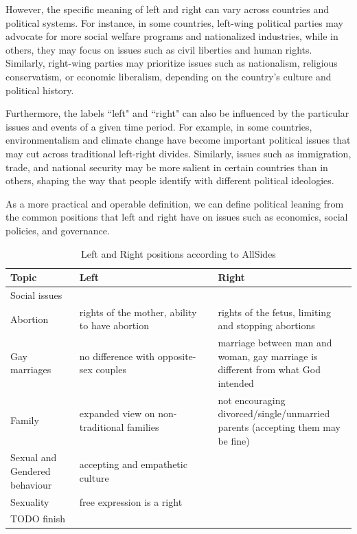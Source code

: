However, the specific meaning of left and right can vary across countries and political systems.
For instance, in some countries, left-wing political parties may advocate for more social welfare programs and nationalized industries, while in others, they may focus on issues such as civil liberties and human rights.
Similarly, right-wing parties may prioritize issues such as nationalism, religious conservatism, or economic liberalism, depending on the country's culture and political history.

Furthermore, the labels ``left" and ``right" can also be influenced by the particular issues and events of a given time period.
For example, in some countries, environmentalism and climate change have become important political issues that may cut across traditional left-right divides.
Similarly, issues such as immigration, trade, and national security may be more salient in certain countries than in others, shaping the way that people identify with different political ideologies.




As a more practical and operable definition, we can define political leaning from the common positions that left and right have on issues such as economics, social policies, and governance.


\begin{table}[ht]
    \centering
    \begin{tabular}{p{0.2\linewidth} | p{0.4\linewidth} | p{0.4\linewidth}}
      Topic  & Left & Right \\ \hline
      Social issues & \\
      Abortion & rights of the mother, ability to have abortion & rights of the fetus, limiting and stopping abortions \\
      Gay marriages & no difference with opposite-sex couples & marriage between man and woman, gay marriage is different from what God intended \\
      Family & expanded view on non-traditional families & not encouraging divorced/single/unmarried parents (accepting them may be fine) \\
      Sexual and Gendered behaviour & accepting and empathetic culture & \\
      Sexuality & free expression is a right & \\
      TODO finish
    \end{tabular}
    \caption{Left and Right positions according to AllSides}
    \label{tab:allsides_leaning_positions}
\end{table}

